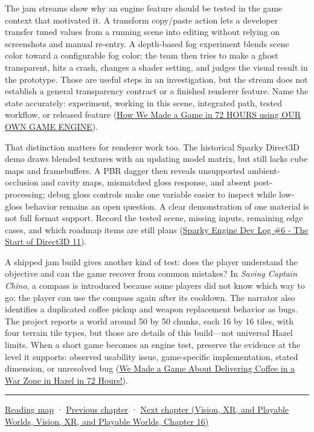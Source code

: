The jam streams show why an engine feature should be tested in the game context that motivated it. A transform copy/paste action lets a developer transfer tuned values from a running scene into editing without relying on screenshots and manual re-entry. A depth-based fog experiment blends scene color toward a configurable fog color; the team then tries to make a ghost transparent, hits a crash, changes a shader setting, and judges the visual result in the prototype. Those are useful steps in an investigation, but the stream does not establish a general transparency contract or a finished renderer feature. Name the state accurately: experiment, working in this scene, integrated path, tested workflow, or released feature (\href{https://www.youtube.com/watch?v=tQ_pjZDfm-0&t=1m10s}{How We Made a Game in 72 HOURS using OUR OWN GAME ENGINE}).

That distinction matters for renderer work too. The historical Sparky Direct3D demo draws blended textures with an updating model matrix, but still lacks cube maps and framebuffers. A PBR dagger then reveals unsupported ambient-occlusion and cavity maps, mismatched gloss response, and absent post-processing; debug gloss controls make one variable easier to inspect while low-gloss behavior remains an open question. A clear demonstration of one material is not full format support. Record the tested scene, missing inputs, remaining edge cases, and which roadmap items are still plans (\href{https://www.youtube.com/watch?v=AsNE-eGmGxs&t=7m34s}{Sparky Engine Dev Log \#6 - The Start of Direct3D 11}).

A shipped jam build gives another kind of test: does the player understand the objective and can the game recover from common mistakes? In \emph{Saving Captain Chino}, a compass is introduced because some players did not know which way to go; the player can use the compass again after its cooldown. The narrator also identifies a duplicated coffee pickup and weapon replacement behavior as bugs. The project reports a world around 50 by 50 chunks, each 16 by 16 tiles, with four terrain tile types, but those are details of this build---not universal Hazel limits. When a short game becomes an engine test, preserve the evidence at the level it supports: observed usability issue, game-specific implementation, stated dimension, or unresolved bug (\href{https://www.youtube.com/watch?v=ahrdtYwBLTk&t=2m10s}{We Made a Game About Delivering Coffee in a War Zone in Hazel in 72 Hours!}).

\begin{center}\rule{0.5\linewidth}{0.5pt}\end{center}

\hyperref[volume-reading-map]{Reading map} · \hyperref[06-engine-ii-ch039-composable-timesteps-and-stable-simulation-policy]{Previous chapter} · \href{../07-Vision-XR-and-Playable-Worlds/main.pdf\#nameddest=06-engine-ii-ch041-evidence-tools-and-revisable-design}{Next chapter (Vision, XR, and Playable Worlds, Vision, XR, and Playable Worlds, Chapter 16)}
